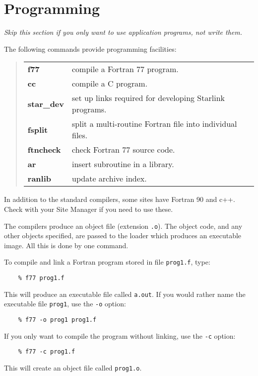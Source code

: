 \newpage

\section{Programming}

{\em Skip this section if you only want to use application programs, not write
them.}

The following commands provide programming facilities:
\begin{quote}
\begin{tabular}{lp{67mm}}

{\bf f77}       & compile a Fortran 77 program.\\
{\bf cc}        & compile a C program.\\
{\bf star\_dev} & set up links required for developing Starlink programs.\\
{\bf fsplit}    & split a multi-routine Fortran file into individual files.\\
{\bf ftncheck}  & check Fortran 77 source code.\\
{\bf ar}        & insert subroutine in a library.\\
{\bf ranlib}    & update archive index.

\end{tabular}
\end{quote}
In addition to the standard compilers, some sites have Fortran 90 and c++.
Check with your Site Manager if you need to use these.

The compilers produce an object file (extension {\tt .o}).
The object code, and any other objects specified, are passed to the loader
which produces an executable image.
All this is done by one command.

To compile and link a Fortran program stored in file {\tt prog1.f}, type:
\begin{verbatim}
    % f77 prog1.f
\end{verbatim}
This will produce an executable file called {\tt a.out}.
If you would rather name the executable file {\tt prog1}, use the {\tt -o}
option:
\begin{verbatim}
    % f77 -o prog1 prog1.f
\end{verbatim}
If you only want to compile the program without linking, use the {\tt -c}
option:
\begin{verbatim}
    % f77 -c prog1.f
\end{verbatim}
This will create an object file called {\tt prog1.o}.

